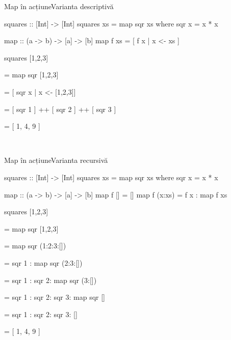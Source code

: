 \documentclass[handout,xcolor=pdftex,romanian,colorlinks]{beamer}
\begin{document}
\begin{frame}[fragile]{Map în acțiune}{Varianta descriptivă}
\begin{minipage}{.49\columnwidth}%
\begin{asciihs}
squares :: [Int] -> [Int]
squares xs = map sqr xs
  where sqr x = x * x
\end{asciihs}
\end{minipage}
\begin{minipage}{.49\columnwidth}
\begin{asciihs}
map :: (a -> b) -> [a] -> [b]
map f xs = [ f x | x <- xs ]
\end{asciihs}
\end{minipage}

\vfill
squares [1,2,3]

\medskip
= map sqr [1,2,3]

\medskip
{}
= [ sqr x | x <- [1,2,3]]

\medskip
{}
= [ sqr 1 ] ++ [ sqr 2 ] ++ [ sqr 3 ]

\medskip
= [ 1, 4, 9 ]

\vfill\
\end{frame}


\begin{frame}[fragile]{Map în acțiune}{Varianta recursivă}
\begin{minipage}{.49\columnwidth}%
\begin{asciihs}
squares :: [Int] -> [Int]
squares xs = map sqr xs
  where sqr x = x * x
\end{asciihs}
\end{minipage}
\begin{minipage}{.49\columnwidth}
\begin{asciihs}
map :: (a -> b) -> [a] -> [b]
map f []     = []
map f (x:xs) = f x : map f xs
\end{asciihs}
\end{minipage}

\vfill
squares [1,2,3]

\medskip
= map sqr [1,2,3]

\medskip
= map sqr (1:2:3:[])

\medskip
{}
= sqr 1 : map sqr (2:3:[])

\medskip
{}
= sqr 1 : sqr 2: map sqr (3:[])

\medskip
= sqr 1 : sqr 2: sqr 3: map sqr []

\medskip
= sqr 1 : sqr 2: sqr 3: []

\medskip
= [ 1, 4, 9 ]

\vfill\
\end{frame}
\end{document}
